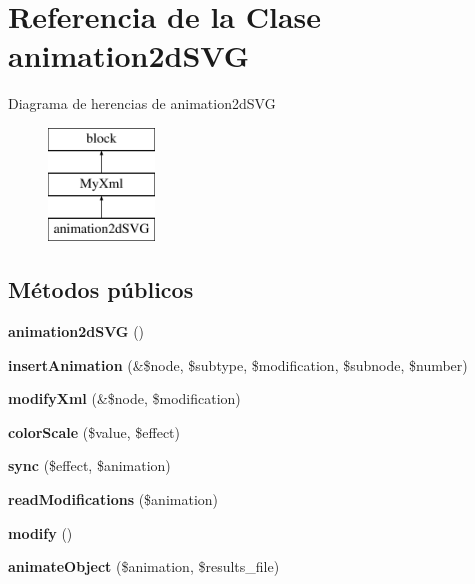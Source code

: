 \hypertarget{classanimation2dSVG}{}\section{Referencia de la Clase animation2d\+S\+VG}
\label{classanimation2dSVG}
Diagrama de herencias de animation2d\+S\+VG\begin{figure}[H]
\begin{center}
\leavevmode
\includegraphics[height=3.000000cm]{classanimation2dSVG}
\end{center}
\end{figure}
\subsection*{Métodos públicos}
\begin{DoxyCompactItemize}
\item 
\mbox{\label{classanimation2dSVG_a68840e06d9ee91727b58fb24d4895a76}} 
{\bfseries animation2d\+S\+VG} ()
\item 
\mbox{\label{classanimation2dSVG_a67a7d085dc5539985c51b47462c1bacb}} 
{\bfseries insert\+Animation} (\&\$node, \$subtype, \$modification, \$subnode, \$number)
\item 
\mbox{\label{classanimation2dSVG_a7e22d227c8cea32004cafcb402ea5801}} 
{\bfseries modify\+Xml} (\&\$node, \$modification)
\item 
\mbox{\label{classanimation2dSVG_a2bc54dba4115d1f3a42a8cddd0e6c911}} 
{\bfseries color\+Scale} (\$value, \$effect)
\item 
\mbox{\label{classanimation2dSVG_a60d4e6ce688357f0fe9d687422f21de5}} 
{\bfseries sync} (\$effect, \$animation)
\item 
\mbox{\label{classanimation2dSVG_a689f583016a3bc58880fef08f3de58f3}} 
{\bfseries read\+Modifications} (\$animation)
\item 
\mbox{\label{classanimation2dSVG_aa1d3f24de8e661f2d95d719631ed3d1f}} 
{\bfseries modify} ()
\item 
\mbox{\label{classanimation2dSVG_aa30d2a69e19e0b6a4473976d58a70a66}} 
{\bfseries animate\+Object} (\$animation, \$results\+\_\+file)
\end{DoxyCompactItemize}
